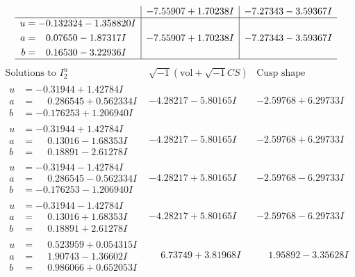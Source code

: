 \documentclass[1p]{elsarticle_modified}
\theoremstyle{definition}
\newcommand{\I}{\sqrt{-1}}
\begin{document}
$$\begin{array}{c|c|c}
 & -7.55907 + 1.70238 I & -7.27343 - 3.59367 I \\ \hline\begin{aligned}
u &= -0.132324 - 1.358820 I \\
a &= \phantom{-}0.07650 - 1.87317 I \\
b &= \phantom{-}0.16530 - 3.22936 I\end{aligned}
 & -7.55907 + 1.70238 I & -7.27343 - 3.59367 I\\
 \hline 
 \end{array}$$\newpage$$\begin{array}{c|c|c}  
\text{Solutions to }I^u_{2}& \I (\text{vol} + \sqrt{-1}CS) & \text{Cusp shape}\\
 \hline 
\begin{aligned}
u &= -0.31944 + 1.42784 I \\
a &= \phantom{-}0.286545 + 0.562334 I \\
b &= -0.176253 + 1.206940 I\end{aligned}
 & -4.28217 - 5.80165 I & -2.59768 + 6.29733 I \\ \hline\begin{aligned}
u &= -0.31944 + 1.42784 I \\
a &= \phantom{-}0.13016 - 1.68353 I \\
b &= \phantom{-}0.18891 - 2.61278 I\end{aligned}
 & -4.28217 - 5.80165 I & -2.59768 + 6.29733 I \\ \hline\begin{aligned}
u &= -0.31944 - 1.42784 I \\
a &= \phantom{-}0.286545 - 0.562334 I \\
b &= -0.176253 - 1.206940 I\end{aligned}
 & -4.28217 + 5.80165 I & -2.59768 - 6.29733 I \\ \hline\begin{aligned}
u &= -0.31944 - 1.42784 I \\
a &= \phantom{-}0.13016 + 1.68353 I \\
b &= \phantom{-}0.18891 + 2.61278 I\end{aligned}
 & -4.28217 + 5.80165 I & -2.59768 - 6.29733 I \\ \hline\begin{aligned}
u &= \phantom{-}0.523959 + 0.054315 I \\
a &= \phantom{-}1.90743 - 1.36602 I \\
b &= \phantom{-}0.986066 + 0.652053 I\end{aligned}
 & \phantom{-}6.73749 + 3.81968 I & \phantom{-}1.95892 - 3.35628 I \\ \hline\begin{aligned}

\end{aligned}
\end{array}$$
\end{document}
